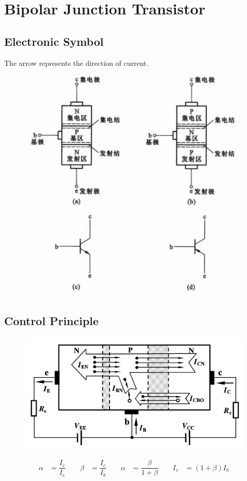\chapter{Bipolar Junction Transistor}

\section{Electronic Symbol}

The arrow represents the direction of current.

\begin{figure}[H]
  \centering
  \includegraphics[width=0.7\linewidth]{figures/BJT-Symbol}
  \label{fig:}
\end{figure}

\section{Control Principle}

\begin{figure}[H]
  \centering
  \includegraphics[width=0.5\linewidth]{figures/BJT-control-principle}
  \label{fig:}
\end{figure}

\begin{equation*}
  \begin{aligned}
    \alpha &= \dfrac{I_{c}}{I_e} \quad\quad 
    \beta &= \dfrac{I_{c}}{I_{b}} \quad\quad 
    \alpha &= \dfrac{\beta}{1 + \beta} \quad\quad
    I_e &= \left( 1 + \beta \right) I_b
  \end{aligned}
\end{equation*}

